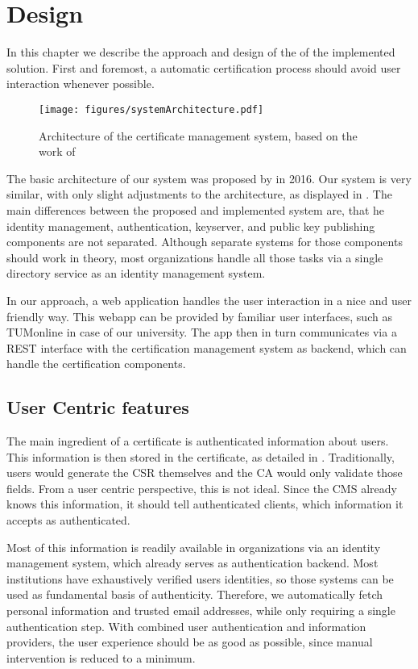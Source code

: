 \chapter{Design}\label{ch:design}

In this chapter we describe the approach and design of the of the implemented solution.
First and foremost, a automatic certification process should avoid user interaction whenever possible.

\begin{figure}
    \centering
    \texttt{[image: figures/systemArchitecture.pdf]}
    \caption{Architecture of the certificate management system, based on the work of \citet{jagdish2016certservice}}
    \label{fig:systemArchitecture}
\end{figure}

The basic architecture of our system was proposed by \citet{jagdish2016certservice} in 2016.
Our system is very similar, with only slight adjustments to the architecture, as displayed in
.
The main differences between the proposed and implemented system are, that he identity management, authentication,
keyserver, and public key publishing components are not separated.
Although separate systems for those components should work in theory, most organizations handle all those tasks via a
single directory service as an identity management system.

In our approach, a web application handles the user interaction in a nice and user friendly way.
This webapp can be provided by familiar user interfaces, such as TUMonline in case of our university.
The app then in turn communicates via a REST interface with the certification management system as backend, which can
handle the certification components.

\section{User Centric features}\label{sec:userDetails}
The main ingredient of a certificate is authenticated information about users.
This information is then stored in the certificate, as detailed in .
Traditionally, users would generate the CSR themselves and the CA would only validate those fields.
From a user centric perspective, this is not ideal.
Since the CMS already knows this information, it should tell authenticated clients, which information it accepts as
authenticated.

Most of this information is readily available in organizations via an identity management system, which already serves
as authentication backend.
Most institutions have exhaustively verified users identities, so those systems can be used as fundamental basis of
authenticity.
Therefore, we automatically fetch personal information and trusted email addresses, while only requiring a single
authentication step.
With combined user authentication and information providers, the user experience should be as good as possible, since
manual intervention is reduced to a minimum.

